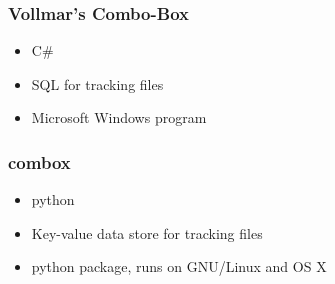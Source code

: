 \begin{frame}
  \frametitle{Vollmar's Combo-Box}

  \begin{itemize}
  \item<1-> C\#
  \item<2-> SQL for tracking files
  \item<3-> Microsoft Windows program
  \end{itemize}

\end{frame}

\begin{frame}
  \frametitle{combox}

  \begin{itemize}
  \item<1-> python
  \item<2-> Key-value data store for tracking files
  \item<3-> python package, runs on GNU/Linux and OS X
  \end{itemize}
\end{frame}